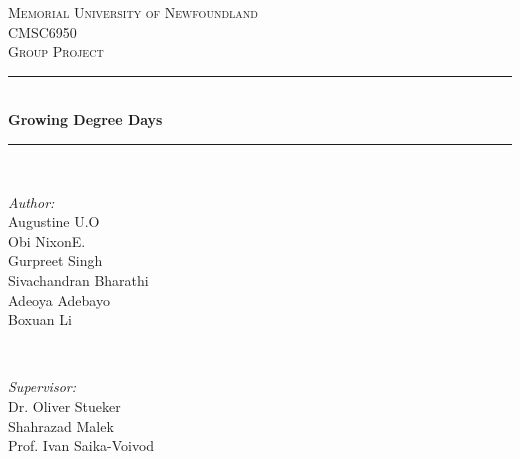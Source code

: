 \begin{titlepage}

\newcommand{\HRule}{\rule{\linewidth}{0.5mm}} %

\center %
 

\textsc{\LARGE Memorial University of Newfoundland}\\[1.5cm] %
\textsc{\Large CMSC6950}\\[0.5cm] %
\textsc{\large Group Project}\\[0.5cm] %


\HRule \\[0.4cm]
{ \huge \bfseries Growing Degree Days }\\[0.4cm] %
\HRule \\[1.5cm]
 

\begin{minipage}{0.4\textwidth}
\begin{flushleft} \large
\emph{Author:}\\
Augustine \textsc{U.O}\\ %
Obi Nixon\textsc{E.}\\ %
Gurpreet Singh\\ %
Sivachandran Bharathi\\ %
Adeoya Adebayo\\ %
Boxuan Li %
\end{flushleft}
\end{minipage}
~
\begin{minipage}{0.4\textwidth}
\begin{flushright} \large
\emph{Supervisor:} \\
Dr. Oliver Stueker\\ %
Shahrazad Malek\\ %
Prof. Ivan Saika-Voivod %
\end{flushright}
\end{minipage}\\[2cm]


\end{titlepage}
